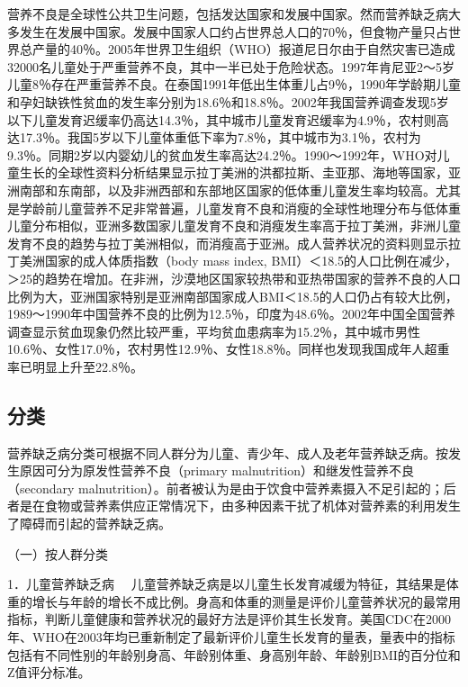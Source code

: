 营养不良是全球性公共卫生问题，包括发达国家和发展中国家。然而营养缺乏病大多发生在发展中国家。发展中国家人口约占世界总人口的70％，但食物产量只占世界总产量的40％。2005年世界卫生组织（WHO）报道尼日尔由于自然灾害已造成32000名儿童处于严重营养不良，其中一半已处于危险状态。1997年肯尼亚2～5岁儿童8％存在严重营养不良。在泰国1991年低出生体重儿占9％，1990年学龄期儿童和孕妇缺铁性贫血的发生率分别为18.6％和18.8％。2002年我国营养调查发现5岁以下儿童发育迟缓率仍高达14.3％，其中城市儿童发育迟缓率为4.9％，农村则高达17.3％。我国5岁以下儿童体重低下率为7.8％，其中城市为3.1％，农村为9.3％。同期2岁以内婴幼儿的贫血发生率高达24.2％。1990～1992年，WHO对儿童生长的全球性资料分析结果显示拉丁美洲的洪都拉斯、圭亚那、海地等国家，亚洲南部和东南部，以及非洲西部和东部地区国家的低体重儿童发生率均较高。尤其是学龄前儿童营养不足非常普遍，儿童发育不良和消瘦的全球性地理分布与低体重儿童分布相似，亚洲多数国家儿童发育不良和消瘦发生率高于拉丁美洲，非洲儿童发育不良的趋势与拉丁美洲相似，而消瘦高于亚洲。成人营养状况的资料则显示拉丁美洲国家的成人体质指数（body
mass index,
BMI）＜18.5的人口比例在减少，＞25的趋势在增加。在非洲，沙漠地区国家较热带和亚热带国家的营养不良的人口比例为大，亚洲国家特别是亚洲南部国家成人BMI＜18.5的人口仍占有较大比例，1989～1990年中国营养不良的比例为12.5％，印度为48.6％。2002年中国全国营养调查显示贫血现象仍然比较严重，平均贫血患病率为15.2％，其中城市男性10.6％、女性17.0％，农村男性12.9％、女性18.8％。同样也发现我国成年人超重率已明显上升至22.8％。

\hypertarget{text00003.htmlux5cux23mllj4}{%
\subsection{分类}\label{text00003.htmlux5cux23mllj4}}

营养缺乏病分类可根据不同人群分为儿童、青少年、成人及老年营养缺乏病。按发生原因可分为原发性营养不良（primary
malnutrition）和继发性营养不良（secondary
malnutrition）。前者被认为是由于饮食中营养素摄入不足引起的；后者是在食物或营养素供应正常情况下，由多种因素干扰了机体对营养素的利用发生了障碍而引起的营养缺乏病。

（一）按人群分类

{1．儿童营养缺乏病}
　儿童营养缺乏病是以儿童生长发育减缓为特征，其结果是体重的增长与年龄的增长不成比例。身高和体重的测量是评价儿童营养状况的最常用指标，判断儿童健康和营养状况的最好方法是评价其生长发育。美国CDC在2000年、WHO在2003年均已重新制定了最新评价儿童生长发育的量表，量表中的指标包括有不同性别的年龄别身高、年龄别体重、身高别年龄、年龄别BMI的百分位和Z值评分标准。

